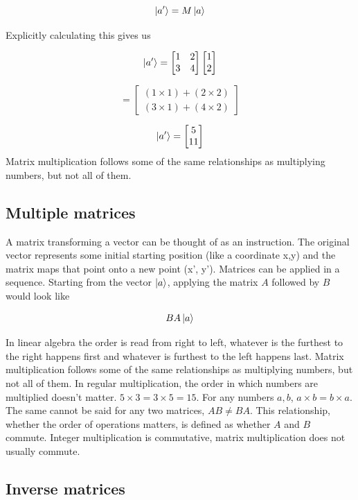 $$ \ket{a'} = M\ket{a} $$

Explicitly calculating this gives us

$$ \ket{a'} =  \begin{bmatrix} 1 & 2  \\ 3 & 4 \end{bmatrix} \begin{bmatrix} 1 \\ 2 \end{bmatrix} $$

$$ = \begin{bmatrix} (1 \times 1) + (2 \times 2) \\ (3 \times 1) + (4 \times 2) \end{bmatrix} $$

$$ \ket{a'} = \begin{bmatrix} 5 \\ 11 \end{bmatrix} $$
Matrix multiplication follows some of the same relationships as multiplying numbers, but not all of them. 

\subsection{Multiple matrices}

A matrix transforming a vector can be thought of as an instruction. The original vector represents some initial starting position (like a coordinate x,y) and the matrix maps that point onto a new point (x', y'). Matrices can be applied in a sequence. Starting from the vector $\ket{a}$, applying the matrix $A$ followed by $B$ would look like 

$$ BA\ket{a} $$

In linear algebra the order is read from right to left, whatever is the furthest to the right happens first and whatever is furthest to the left happens last. Matrix multiplication follows some of the same relationships as multiplying numbers, but not all of them. In regular multiplication, the order in which numbers are multiplied doesn't matter. $ 5 \times 3 = 3 \times 5 = 15 $. For any numbers $a, b$, $a \times b = b \times a$. The same cannot be said for any two matrices, $ AB \neq BA $. This relationship, whether the order of operations matters, is defined as whether $A$ and $B$ commute. Integer multiplication is commutative, matrix multiplication does not usually commute.  

\subsection{ Inverse matrices }

